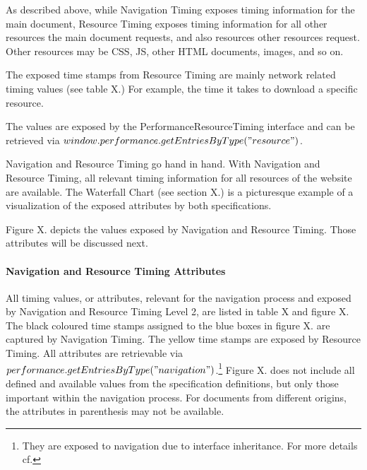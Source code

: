 As described above, while Navigation Timing exposes timing information for the main document, Resource Timing exposes timing information for all other resources the main document requests, and also resources other resources request.
Other resources may be CSS, JS, other HTML documents, images, and so on.

The exposed time stamps from Resource Timing are mainly network related timing values (see table X.)
For example, the time it takes to download a specific resource.



The values are exposed by the PerformanceResourceTiming interface and can be retrieved via $window.performance.getEntriesByType("resource")$.





Navigation and Resource Timing go hand in hand.
With Navigation and Resource Timing, all relevant timing information for all resources of the website are available.
The Waterfall Chart (see section X.) is a picturesque example of a visualization of the exposed attributes by both specifications.

Figure X. depicts the values exposed by Navigation and Resource Timing.
Those attributes will be discussed next.







\paragraph{Navigation and Resource Timing Attributes}

All timing values, or attributes, relevant for the navigation process and exposed by Navigation and Resource Timing Level 2, are listed in table X and figure X.
The black coloured time stamps assigned to the blue boxes in figure X. are captured by Navigation Timing.
The yellow time stamps are exposed by Resource Timing.
All attributes are retrievable via $performance.getEntriesByType("navigation")$.\footnote{They are exposed to navigation due to interface inheritance. For more details cf. } %
Figure X. does not include all defined and available values from the specification definitions, but only those important within the navigation process.
For documents from different origins, the attributes in parenthesis may not be available.%

